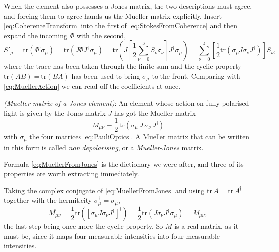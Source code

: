             When the element also possesses a Jones matrix, the two descriptions must agree, and forcing them to agree hands us the Mueller matrix explicitly. Insert \ref{eq:CoherenceTransform} into the first of \ref{eq:StokesFromCoherence} and then expand the incoming $\Phi$ with the second,
            \begin{equation*}
                S'_\mu = \text{tr}\left(\Phi'\sigma_\mu\right) = \text{tr}\left(J\Phi J^{\dagger}\sigma_\mu\right) = \text{tr}\left(J\left[\frac{1}{2}\sum_{\nu=0}^{3}S_\nu\sigma_\nu\right]J^{\dagger}\sigma_\mu\right) = \sum_{\nu=0}^{3}\left[\frac{1}{2}\text{tr}\left(\sigma_\mu J\sigma_\nu J^{\dagger}\right)\right]S_\nu ,
            \end{equation*}
            where the trace has been taken through the finite sum and the cyclic property $\text{tr}(AB)=\text{tr}(BA)$ has been used to bring $\sigma_\mu$ to the front. Comparing with \ref{eq:MuellerAction} we can read off the coefficients at once.

            \begin{myDef}
                \textit{(Mueller matrix of a Jones element)}: An element whose action on fully polarised light is given by the Jones matrix $J$ has got the Mueller matrix
                \begin{equation}\label{eq:MuellerFromJones}
                    \boxed{\;M_{\mu\nu} = \frac{1}{2}\,\text{tr}\left(\sigma_\mu\,J\,\sigma_\nu\,J^{\dagger}\right)\;}
                \end{equation}
                with $\sigma_\mu$ the four matrices \ref{eq:PauliOptics}. A Mueller matrix that can be written in this form is called \emph{non depolarising}, or a \emph{Mueller-Jones} matrix.
            \end{myDef}

            Formula \ref{eq:MuellerFromJones} is the dictionary we were after, and three of its properties are worth extracting immediately.

            Taking the complex conjugate of \ref{eq:MuellerFromJones} and using $\overline{\text{tr}\,A}=\text{tr}\,A^{\dagger}$ together with the hermiticity $\sigma_\mu^{\dagger}=\sigma_\mu$,
            \begin{equation*}
                \overline{M_{\mu\nu}} = \frac{1}{2}\text{tr}\left(\left[\sigma_\mu J\sigma_\nu J^{\dagger}\right]^{\dagger}\right) = \frac{1}{2}\text{tr}\left(J\sigma_\nu J^{\dagger}\sigma_\mu\right) = M_{\mu\nu} ,
            \end{equation*}
            the last step being once more the cyclic property. So $M$ is a real matrix, as it must be, since it maps four measurable intensities into four measurable intensities.


